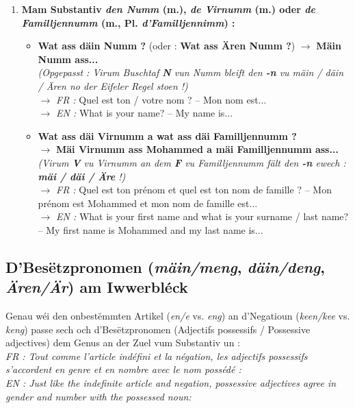 \begin{enumerate}
    \vspace{0.3em}

    \item \textbf{Mam Substantiv \textit{den Numm} (m.), \textit{de Virnumm} (m.) oder \textit{de Familljennumm} (m., Pl. \textit{d'Familljennimm}) :}
    \begin{itemize}
        \item \textbf{Wat ass däin Numm ?} (oder : \textbf{Wat ass Ären Numm ?}) $\rightarrow$ \textbf{Mäin Numm ass...} \\
        \textit{(Opgepasst : Virum Buschtaf \textbf{N} vun \textit{Numm} bleift den \textbf{-n} vu \textit{mäin / däin / Ären} no der Eifeler Regel stoen !)} \\
        $\rightarrow$ \textit{FR :} Quel est ton / votre nom ? -- Mon nom est... \\
        $\rightarrow$ \textit{EN :} What is your name? -- My name is...
        \item \textbf{Wat ass däi Virnumm a wat ass däi Familljennumm ?} \\
        $\rightarrow$ \textbf{Mäi Virnumm ass Mohammed a mäi Familljennumm ass...} \\
        \textit{(Virum \textbf{V} vu \textit{Virnumm} an dem \textbf{F} vu \textit{Familljennumm} fält den \textbf{-n} ewech : \textbf{mäi / däi / Äre} !)} \\
        $\rightarrow$ \textit{FR :} Quel est ton prénom et quel est ton nom de famille ? -- Mon prénom est Mohammed et mon nom de famille est... \\
        $\rightarrow$ \textit{EN :} What is your first name and what is your surname / last name? -- My first name is Mohammed and my last name is...
    \end{itemize}
\end{enumerate}

\subsection{D'Besëtzpronomen (\textit{mäin/meng}, \textit{däin/deng}, \textit{Ären/Är}) am Iwwerbléck}

Genau wéi den onbestëmmten Artikel (\textit{en/e} vs. \textit{eng}) an d'Negatioun (\textit{keen/kee} vs. \textit{keng}) passe sech och d'Besëtzpronomen (Adjectifs possessifs / Possessive adjectives) dem Genus an der Zuel vum Substantiv un : \\
\textit{FR : Tout comme l'article indéfini et la négation, les adjectifs possessifs s'accordent en genre et en nombre avec le nom possédé :} \\
\textit{EN : Just like the indefinite article and negation, possessive adjectives agree in gender and number with the possessed noun:}


